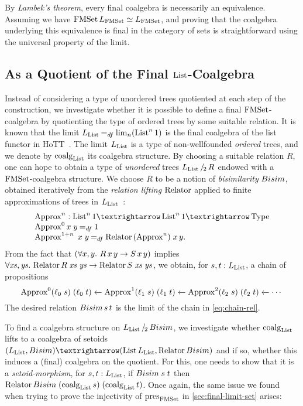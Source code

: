 \documentclass[final,a4paper,USenglish,cleveref]{lipics-v2021}
\begin{document}
By \emph{Lambek's theorem}, every final coalgebra is necessarily an equivalence.
Assuming \LLPO{} we have $\FMSet \Lim{\FMSet} \simeq \Lim{\FMSet}$, and proving that the coalgebra underlying this equivalence is final in the category of sets is straightforward using the universal property of the limit.

\subsection{As a Quotient of the Final \texorpdfstring{$\List$}{List}-Coalgebra}\label{sec:final-quotient-set}

Instead of considering a type of unordered trees quotiented at each step of the construction,
we investigate whether it is possible to define a final
$\FMSet$-coalgebra by quotienting the type of ordered trees by some suitable relation.
It is known that the limit $\Lim{\List} \DefEq \lim_n (\List^n 1)$ is the final coalgebra of the list functor in HoTT~\cite{Ahrens2015}.
The limit $\Lim{\List}$ is a type of non-wellfounded \emph{ordered} trees,
and we denote by $\coalg{\List}$ its coalgebra structure.
By choosing a suitable relation $R$, one can hope to obtain a type of
\emph{unordered} trees $\SetQuot[\Lim{\List}][R]$ endowed with a $\FMSet$-coalgebra structure.
We choose $R$ to be a notion of \emph{bisimilarity} $\Bisim$,
obtained iteratively from the \emph{relation lifting} $\Relator$ applied to finite approximations of trees in $\Lim{\List}$~\cite{Hasuo2013}:
\[
\begin{array}{l}
  \Approx^n : \List^n 1 → \List^n 1 → \Type \\
  \Approx^0 x\;y \DefEq 1 \\
  \Approx^{1+n}\;x\;y \DefEq \Relator \,(\Approx^n)\;x\,y.
\end{array}
\]
From the fact that $(\forall x,y\mathpunct{.}\, R \,x\,y \to S \,x\,y)$ implies $\forall \Var{xs},\Var{ys} \Where \Relator  R\;\Var{xs}\;\Var{ys} \to \Relator S\;\Var{xs}\;\Var{ys}$,
we obtain, for $s, t : \Lim{\List}$, a chain of propositions
\begin{equation}\label{eq:chain-rel}
  \Approx^0 (\ell_0\; s)\; (\ell_0\; t)
    \xleftarrow{} {\Approx^1 (\ell_1\; s)\; (\ell_1\; t)}
    \xleftarrow{} {\Approx^2 (\ell_2\; s)\; (\ell_2\; t)}
    \xleftarrow{} %
      \cdots
\end{equation}
The desired relation $\Bisim\,s\,t$ is the limit of the chain in \eqref{eq:chain-rel}.

To find a coalgebra structure on $\SetQuot[\Lim{\List}][\Bisim]$,
we investigate whether $\coalg{\List}$ lifts to a coalgebra of setoids $(\Lim{\List}, \Bisim) → (\List \Lim{\List}, \Relator \Bisim)$ and if so,
whether this induces a (final) coalgebra on the quotient.
For this, one needs to show that it is a \emph{setoid-morphism},
\ie for $s, t : \Lim{\List}$, if $\Bisim\;s\;t$
then $\Relator \Bisim\; (\coalg{\List} s)\; (\coalg{\List} t)$.
Once again, the same issue we found when trying to prove the injectivity of $\pres{\FMSet}$ in \cref{sec:final-limit-set} arises:
\end{document}
